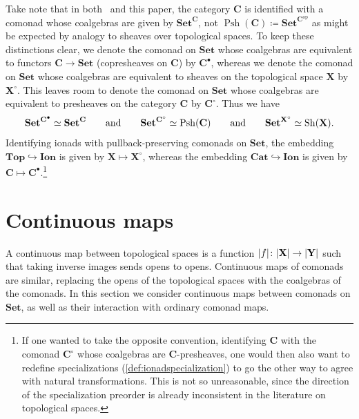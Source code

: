 \documentclass[11pt, oneside, article]{memoir}
\makeatletter
\theoremstyle{plain}
\theoremstyle{definition}
\theoremstyle{remark}
\def\theHsection{\theHchapter.\arabic{section}}
\def\theHtheorem{\theHsection.\arabic{theorem}}
\def\theHcorollary{\theHsection.\arabic{theorem}}
\def\theHproposition{\theHsection.\arabic{theorem}}
\def\theHlemma{\theHsection.\arabic{theorem}}
\def\theHconjecture{\theHsection.\arabic{theorem}}
\def\theHdefinition{\theHsection.\arabic{theorem}}
\def\theHmyremark{\theHsection.\arabic{theorem}}
\def\theHmyexample{\theHsection.\arabic{theorem}}
\def\theHmyconvention{\theHsection.\arabic{theorem}}
\def\theHmywarning{\theHsection.\arabic{theorem}}
\def\theHmycounterexample{\theHsection.\arabic{theorem}}
\def\theHdef{\theHsection.\arabic{theorem}}
\def\theHrem{\theHsection.\arabic{theorem}}
\let\@origchapter\chapter
\renewcommand{\thechapter}{\arabic{chapter}}
\newif\if@inappendixmode
\newcommand{\@syncthmdisplay}{%
  \global\let\thedef\thetheorem
  \global\let\therem\thetheorem
  \global\let\thedefinition\thetheorem
  \global\let\thelemma\thetheorem
  \global\let\thecorollary\thetheorem
  \global\let\theproposition\thetheorem
  \global\let\theconjecture\thetheorem
  \global\let\themyremark\thetheorem
  \global\let\themyexample\thetheorem
  \global\let\themyconvention\thetheorem
  \global\let\themywarning\thetheorem
  \global\let\themycounterexample\thetheorem
}
\newcommand{\@syncthmH}[1]{%
  \gdef\theHtheorem{#1}\gdef\theHcorollary{#1}\gdef\theHproposition{#1}%
  \gdef\theHlemma{#1}\gdef\theHconjecture{#1}\gdef\theHdefinition{#1}%
  \gdef\theHmyremark{#1}\gdef\theHmyexample{#1}\gdef\theHmyconvention{#1}%
  \gdef\theHmywarning{#1}\gdef\theHmycounterexample{#1}%
  \gdef\theHdef{#1}\gdef\theHrem{#1}%
}
\renewcommand{\chapter}{%
  \if@inappendixmode%
    \renewcommand{\thechapter}{\Alph{chapter}}%
    \renewcommand{\theHchapter}{\Alph{chapter}}%
    \counterwithout*{theorem}{section}%
    \gdef\thetheorem{\thechapter.\arabic{theorem}}%
    \@syncthmdisplay
    \@syncthmH{\theHchapter.\arabic{theorem}}%
  \else
    \renewcommand{\thechapter}{\arabic{chapter}}%
    \renewcommand{\theHchapter}{\arabic{chapter}}%
  \fi
  \@origchapter
}
\newenvironment{convention}
{\renewcommand\qedsymbol{$\lrcorner$}%
  \pushQED{\qed}\myconvention}
{\popQED\endmyconvention}
\DeclareMathOperator{\Sh}{Sh}
\DeclareMathOperator{\Psh}{Psh}
\DeclareMathOperator{\ophelper}{op}
\DeclarePairedDelimiter{\abs}{\lvert}{\rvert}
\newcommand{\op}{^{\ophelper}}
\newcommand{\tn}[1]{\textnormal{#1}}
\newcommand{\namedcat}[1]{\mathbf{#1}}
\newcommand{\cat}[1]{\mathbf{#1}}
\newcommand{\spa}[1]{\mathbf{#1}}
\newcommand{\Set}{\namedcat{Set}}
\newcommand{\Cat}{\namedcat{Cat}}
\renewcommand{\Top}{\namedcat{Top}}
\newcommand{\CoalgOn}[2]{{#2}^{#1}}
\newcommand{\CoalgSet}[1]{\CoalgOn{#1}{\Set}}
\newcommand{\pts}[1]{{\abs{#1}}}
\newcommand{\one}[1]{\pts{#1}}
\newcommand{\fun}[2]{{#2}^{#1}}
\newcommand{\Ps}[1]{\Psh(#1)}
\newcommand{\Ionad}{\namedcat{Ion}}
\newcommand{\bC}{\cat{C}}
\newcommand{\tX}{\spa{X}}
\newcommand{\tY}{\spa{Y}}
\newcommand{\cX}{\toptocmd{\tX}}
\newcommand{\cbC}{\cattocmd{\bC}}
\newcommand{\cattocmd}[1]{{{#1}^\bullet}}
\newcommand{\cattocmdp}[1]{{{#1}^\circ}}
\newcommand{\toptocmd}[1]{{{#1}^\circ}}
\newcommand{\hh}[2][]{#1 \tn{#2} #1}
\newcommand{\qqand}{\hh[\qquad]{and}}
\makeatother
\begin{document}
\begin{convention}\label{rem:cats}
  Take note that in both~\cite{garner:ionads} and this paper, the
  category $\bC$ is identified with a comonad whose coalgebras are
  given by $\fun{\bC}{\Set}$, not
  $\Ps{\bC} \coloneqq \fun{\bC\op}{\Set}$ as might be expected by
  analogy to sheaves over topological spaces. To keep these
  distinctions clear, we denote the comonad on $\Set$ whose coalgebras
  are equivalent to functors $\bC \to \Set$ (copresheaves on $\bC$) by
  $\cbC$, whereas we denote the comonad on $\Set$ whose coalgebras are
  equivalent to sheaves on the topological space $\tX$ by $\cX$. This
  leaves room to denote the comonad on $\Set$ whose coalgebras are
  equivalent to presheaves on the category $\bC$ by $\cattocmdp{\bC}$.
  Thus we have
  \[
    \CoalgSet{\cbC} \simeq \fun{\bC}{\Set}
    \qqand
    \CoalgSet{\cattocmdp{\bC}} \simeq \Ps{\bC}
    \qqand
    \CoalgSet{\cX} \simeq \Sh(\tX).
  \]
  Identifying ionads with pullback-preserving comonads on $\Set$, the
  embedding $\Top \hookrightarrow \Ionad$ is given by
  $\tX \mapsto \cX$, whereas the embedding
  $\Cat \hookrightarrow \Ionad$ is given by
  $\bC \mapsto \cbC$.\footnote{If one wanted to take the opposite
    convention, identifying $\bC$ with the comonad $\cattocmdp{\bC}$
    whose coalgebras are $\bC$-presheaves, one would then also want to
    redefine specializations (\cref{def:ionadspecialization}) to go
    the other way to agree with natural transformations. This is not
    so unreasonable, since the direction of the specialization
    preorder is already inconsistent in the literature on topological
    spaces.}
\end{convention}



\chaptertocspace
\chapter{Continuous maps}\label{sec:set}

A continuous map between topological spaces is a function
$\one{f} \colon \pts{\tX} \to \pts{\tY}$ such that taking inverse
images sends opens to opens. Continuous maps of comonads are similar,
replacing the opens of the topological spaces with the coalgebras of
the comonads. In this section we consider continuous maps between
comonads on $\Set$, as well as their interaction with ordinary comonad
maps.
\end{document}
